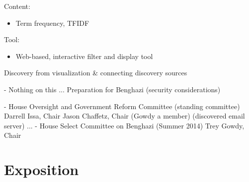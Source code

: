 \documentclass[journal]{vgtc}                %
\begin{document}
   
 Content:
\begin{itemize}
\item Term frequency, TFIDF
\end{itemize}

   
 Tool: 
\begin{itemize}
\item Web-based, interactive filter and display tool
\end{itemize}
    
    
Discovery from visualization \& connecting discovery sources



- Nothing on this ... Preparation for Benghazi (security considerations)

- House Oversight and Government Reform Committee (standing committee) 
  Darrell Issa, Chair
     Jason Chaffetz, Chair (Gowdy a member)
  (discovered email server)
    ... 
- House Select Committee on Benghazi (Summer 2014) 
   Trey Gowdy, Chair

\section{Exposition}



\newpage

%
%
%
%


\end{document}
